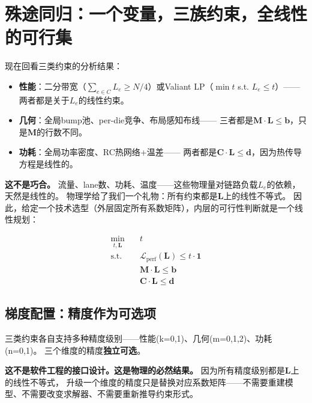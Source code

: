 \section{殊途同归：一个变量，三族约束，全线性的可行集}

现在回看三类约束的分析结果：

\begin{itemize}
    \item \textbf{性能}：二分带宽（$\sum_{e \in C} L_e \ge N/4$）或Valiant LP（$\min t$ s.t. $L_e \le t$）——
    两者都是关于$L_e$的线性约束。
    \item \textbf{几何}：全局bump池、per-die竞争、布局感知布线——
    三者都是$\mathbf{M} \cdot \mathbf{L} \le \mathbf{b}$，只是$\mathbf{M}$的行数不同。
    \item \textbf{功耗}：全局功率密度、RC热网络+温差——
    两者都是$\mathbf{C} \cdot \mathbf{L} \le \mathbf{d}$，因为热传导方程是线性的。
\end{itemize}

\textbf{这不是巧合。}
流量、lane数、功耗、温度——这些物理量对链路负载$L_e$的依赖，天然是线性的。
物理学给了我们一个礼物：所有约束都是$\mathbf{L}$上的线性不等式。
因此，给定一个技术选型（外层固定所有系数矩阵），内层的可行性判断就是一个线性规划：

\begin{equation}\label{eq:unified}
    \boxed{
    \begin{aligned}
    \min_{t, \mathbf{L}} \quad & t \\[4pt]
    \text{s.t.} \quad & \mathcal{L}_{\text{perf}}(\mathbf{L}) \le t \cdot \mathbf{1} \\
    & \mathbf{M} \cdot \mathbf{L} \le \mathbf{b} \\
    & \mathbf{C} \cdot \mathbf{L} \le \mathbf{d}
    \end{aligned}
    }
\end{equation}

\subsection{梯度配置：精度作为可选项}

三类约束各自支持多种精度级别——性能(k=0,1)、几何(m=0,1,2)、功耗(n=0,1)。
三个维度的精度\textbf{独立可选}。

\textbf{这不是软件工程的接口设计。这是物理的必然结果。}
因为所有精度级别都是$\mathbf{L}$上的线性不等式，
升级一个维度的精度只是替换对应系数矩阵——不需要重建模型、不需要改变求解器、不需要重新推导约束形式。

